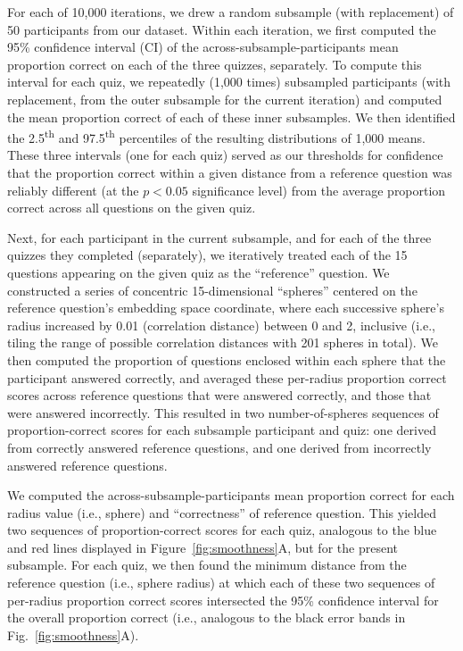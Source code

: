 \documentclass[10pt]{article}
\begin{document}
For each of 10,000 iterations, we drew a random subsample (with replacement) of
50 participants from our dataset. Within each iteration, we first computed the
95\% confidence interval (CI) of the across-subsample-participants mean
proportion correct on each of the three quizzes, separately. To compute this
interval for each quiz, we repeatedly (1,000 times) subsampled participants
(with replacement, from the outer subsample for the current iteration) and
computed the mean proportion correct of each of these inner subsamples. We then
identified the 2.5\textsuperscript{th} and 97.5\textsuperscript{th} percentiles
of the resulting distributions of 1,000 means. These three intervals (one for
each quiz) served as our thresholds for confidence that the proportion correct
within a given distance from a reference question was reliably different (at
the $p < 0.05$ significance level) from the average proportion correct across
all questions on the given quiz.

Next, for each participant in the current subsample, and for each of the three
quizzes they completed (separately), we iteratively treated each of the 15
questions appearing on the given quiz as the ``reference'' question. We
constructed a series of concentric 15-dimensional ``spheres'' centered on the
reference question's embedding space coordinate, where each successive sphere's
radius increased by 0.01 (correlation distance) between 0 and 2, inclusive
(i.e., tiling the range of possible correlation distances with 201 spheres in
total). We then computed the proportion of questions enclosed within each
sphere that the participant answered correctly, and averaged these per-radius
proportion correct scores across reference questions that were answered
correctly, and those that were answered incorrectly. This resulted in two
number-of-spheres sequences of proportion-correct scores for each subsample
participant and quiz: one derived from correctly answered reference questions,
and one derived from incorrectly answered reference questions.

We computed the across-subsample-participants mean proportion correct for each
radius value (i.e., sphere) and ``correctness'' of reference question. This
yielded two sequences of proportion-correct scores for each quiz, analogous to
the blue and red lines displayed in Figure~\ref{fig:smoothness}A, but for the
present subsample. For each quiz, we then found the minimum distance from the
reference question (i.e., sphere radius) at which each of these two sequences
of per-radius proportion correct scores intersected the 95\% confidence
interval for the overall proportion correct (i.e., analogous to the black error
bands in Fig.~\ref{fig:smoothness}A).
\end{document}
